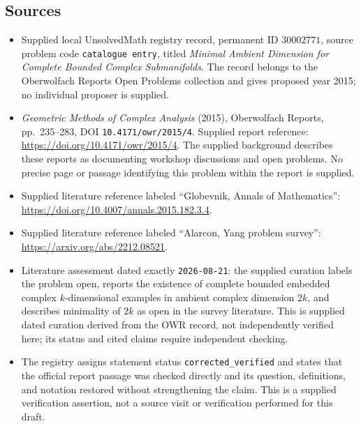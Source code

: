\documentclass[11pt]{article}
\begin{document}
\subsection{Sources}
\begin{itemize}
\item Supplied local UnsolvedMath registry record, permanent ID \(30002771\), source problem code \texttt{catalogue entry}, titled \emph{Minimal Ambient Dimension for Complete Bounded Complex Submanifolds}. The record belongs to the Oberwolfach Reports Open Problems collection and gives proposed year 2015; no individual proposer is supplied.
\item \emph{Geometric Methods of Complex Analysis} (2015), Oberwolfach Reports, pp.\ 235--283, DOI \texttt{10.4171/owr/2015/4}. Supplied report reference: \url{https://doi.org/10.4171/owr/2015/4}. The supplied background describes these reports as documenting workshop discussions and open problems. No precise page or passage identifying this problem within the report is supplied.
\item Supplied literature reference labeled ``Globevnik, Annals of Mathematics'': \url{https://doi.org/10.4007/annals.2015.182.3.4}.
\item Supplied literature reference labeled ``Alarcon, Yang problem survey'': \url{https://arxiv.org/abs/2212.08521}.
\item Literature assessment dated exactly \texttt{2026-08-21}: the supplied curation labels the problem open, reports the existence of complete bounded embedded complex \(k\)-dimensional examples in ambient complex dimension \(2k\), and describes minimality of \(2k\) as open in the survey literature. This is supplied dated curation derived from the OWR record, not independently verified here; its status and cited claims require independent checking.
\item The registry assigns statement status \texttt{corrected\_verified} and states that the official report passage was checked directly and its question, definitions, and notation restored without strengthening the claim. This is a supplied verification assertion, not a source visit or verification performed for this draft.
\end{itemize}
\end{document}
